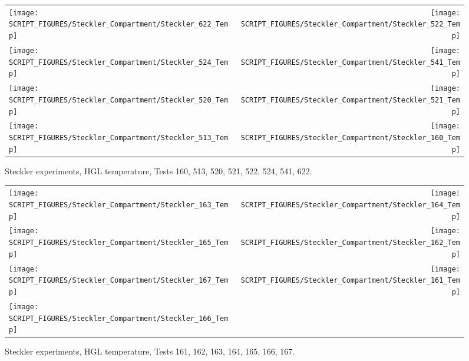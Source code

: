 \begin{figure}[p]
\begin{tabular*}{\textwidth}{l@{\extracolsep{\fill}}r}
\texttt{[image: SCRIPT\_FIGURES/Steckler\_Compartment/Steckler\_622\_Temp]} &
\texttt{[image: SCRIPT\_FIGURES/Steckler\_Compartment/Steckler\_522\_Temp]} \\
\texttt{[image: SCRIPT\_FIGURES/Steckler\_Compartment/Steckler\_524\_Temp]} &
\texttt{[image: SCRIPT\_FIGURES/Steckler\_Compartment/Steckler\_541\_Temp]} \\
\texttt{[image: SCRIPT\_FIGURES/Steckler\_Compartment/Steckler\_520\_Temp]} &
\texttt{[image: SCRIPT\_FIGURES/Steckler\_Compartment/Steckler\_521\_Temp]} \\
\texttt{[image: SCRIPT\_FIGURES/Steckler\_Compartment/Steckler\_513\_Temp]} &
\texttt{[image: SCRIPT\_FIGURES/Steckler\_Compartment/Steckler\_160\_Temp]}
\end{tabular*}
\caption[Steckler experiments, HGL temperature, Tests 160, 513, 520, 521, 522, 524, 541, 622]
{Steckler experiments, HGL temperature, Tests 160, 513, 520, 521, 522, 524, 541, 622.}
\label{Steckler_Temp_6}
\end{figure}

\begin{figure}[p]
\begin{tabular*}{\textwidth}{l@{\extracolsep{\fill}}r}
\texttt{[image: SCRIPT\_FIGURES/Steckler\_Compartment/Steckler\_163\_Temp]} &
\texttt{[image: SCRIPT\_FIGURES/Steckler\_Compartment/Steckler\_164\_Temp]} \\
\texttt{[image: SCRIPT\_FIGURES/Steckler\_Compartment/Steckler\_165\_Temp]} &
\texttt{[image: SCRIPT\_FIGURES/Steckler\_Compartment/Steckler\_162\_Temp]} \\
\texttt{[image: SCRIPT\_FIGURES/Steckler\_Compartment/Steckler\_167\_Temp]} &
\texttt{[image: SCRIPT\_FIGURES/Steckler\_Compartment/Steckler\_161\_Temp]} \\
\texttt{[image: SCRIPT\_FIGURES/Steckler\_Compartment/Steckler\_166\_Temp]} &
\end{tabular*}
\caption[Steckler experiments, HGL temperature, Tests 161, 162, 163, 164, 165, 166, 167]
{Steckler experiments, HGL temperature, Tests 161, 162, 163, 164, 165, 166, 167.}
\label{Steckler_Temp_7}
\end{figure}


\clearpage


